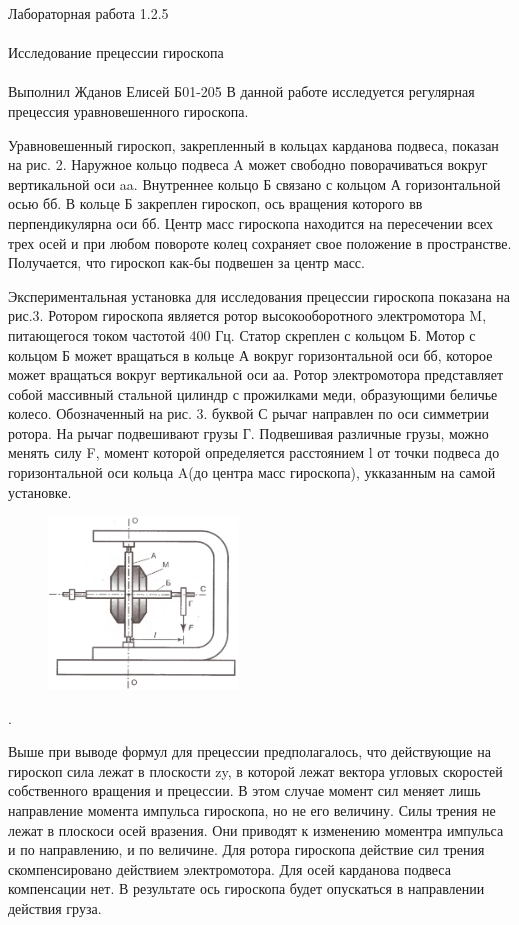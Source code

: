 \documentclass{astroedu-lab}
\begin{document}
\begin{problem}{\huge Лабораторная работа 1.2.5\\\\Исследование прецессии гироскопа\\\\Выполнил Жданов Елисей Б01-205}
В данной работе исследуется регулярная прецессия уравновешенного гироскопа.

Уравновешенный гироскоп, закрепленный в кольцах карданова подвеса, показан на рис. 2. Наружное кольцо подвеса A может свободно поворачиваться вокруг вертикальной оси aa. Внутреннее кольцо Б связано с кольцом А горизонтальной осью бб. В кольце Б закреплен гироскоп, ось вращения которого вв перпендикулярна оси бб. Центр масс гироскопа находится на пересечении всех трех осей и при любом повороте колец сохраняет свое положение в пространстве. Получается, что гироскоп как-бы подвешен за центр масс.

Экспериментальная установка для исследования прецессии гироскопа показана на рис.3. Ротором гироскопа является ротор высокооборотного электромотора M, питающегося током частотой 400 Гц. Статор скреплен с кольцом Б. Мотор с кольцом Б может вращаться в кольце А вокруг горизонтальной оси бб, которое может вращаться вокруг вертикальной оси аа. Ротор электромотора представляет собой массивный стальной цилиндр с прожилками меди, образующими беличье колесо. Обозначенный на рис. 3. буквой С рычаг направлен по оси симметрии ротора. На рычаг подвешивают грузы Г. Подвешивая различные грузы, можно менять силу F, момент которой определяется расстоянием l от точки подвеса до горизонтальной оси кольца A(до центра масс гироскопа), укказанным на самой установке.

\newpage

\begin{figure}
\includegraphics[width=0.45\textwidth]{state_2.png}
\caption{}
\label{ris:image}
\end{figure}.

Выше при выводе формул для прецессии предполагалось, что действующие на гироскоп сила лежат в плоскости zy, в которой лежат вектора угловых скоростей собственного вращения и прецессии. В этом случае момент сил меняет лишь направление момента импульса гироскопа, но не его величину. Силы трения не лежат в плоскоси осей вразения. Они приводят к изменению моментра импульса и по направлению, и по величине. Для ротора гироскопа действие сил трения скомпенсировано действием электромотора. Для осей карданова подвеса компенсации нет. В результате ось гироскопа будет опускаться в направлении действия груза.


\end{problem}
\end{document}

